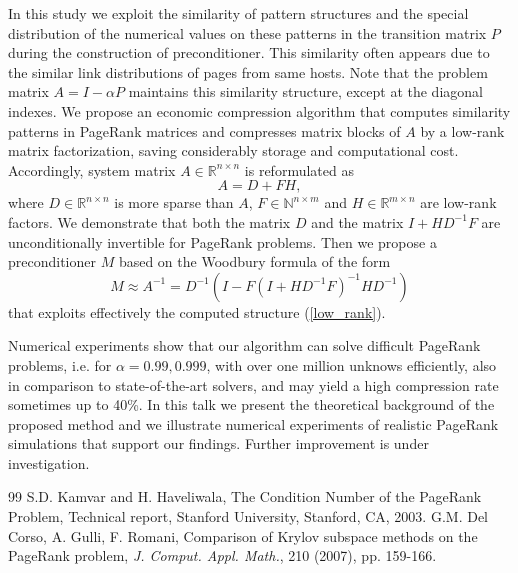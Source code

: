 \documentclass{report}
\begin{document}
In this study we exploit the similarity of pattern structures and the
special distribution of the numerical values on these patterns in the
transition matrix $P$ during the construction of preconditioner.
This similarity often appears due to the similar link distributions of
pages from same hosts. Note that the problem matrix $A=I-\alpha P$
maintains this similarity structure, except at the diagonal indexes. We
propose an economic compression algorithm that computes similarity
patterns in PageRank matrices and compresses matrix blocks of $A$ by a
low-rank matrix factorization, saving considerably storage and
computational cost. Accordingly, system matrix $A\in \mathbb{R}^{n\times
n}$ is reformulated as
\begin{equation}\label{low_rank}
A=D+FH,
\end{equation}
where $D\in \mathbb{R}^{n\times n}$ is more sparse than $A$, $F\in
\mathbb{N}^{n\times m}$ and $H \in \mathbb{R}^{m\times n}$ are low-rank
factors. We demonstrate that both the matrix $D$ and the matrix
$I+HD^{-1}F$ are unconditionally invertible for PageRank problems. Then
we propose a preconditioner $M$ based on the Woodbury formula of the form
\begin{equation}\label{preconditioner}
M\approx A^{-1}=D^{-1}(I-F(I+HD^{-1}F)^{-1}HD^{-1})
\end{equation}
that exploits effectively the computed structure (\ref{low_rank}).

Numerical experiments show that our algorithm can solve difficult
PageRank problems, i.e. for $\alpha=0.99,0.999$, with over one million
unknows efficiently, also in comparison to state-of-the-art solvers, and
may yield a high compression rate sometimes up to 40\%. In this talk we
present the theoretical background of the proposed method and we
illustrate numerical experiments of realistic PageRank simulations that
support our findings. Further improvement is under investigation.
{\small\begin{thebibliography}{99}
S.D. Kamvar and H. Haveliwala,
The Condition Number of the PageRank Problem, Technical
report, Stanford University, Stanford, CA, 2003.
G.M. Del Corso, A. Gulli, F. Romani, Comparison of Krylov
subspace methods on the
PageRank problem, \textit{J. Comput. Appl. Math.}, 210 (2007), pp. 159-166.
\end{thebibliography}}
\end{document}
